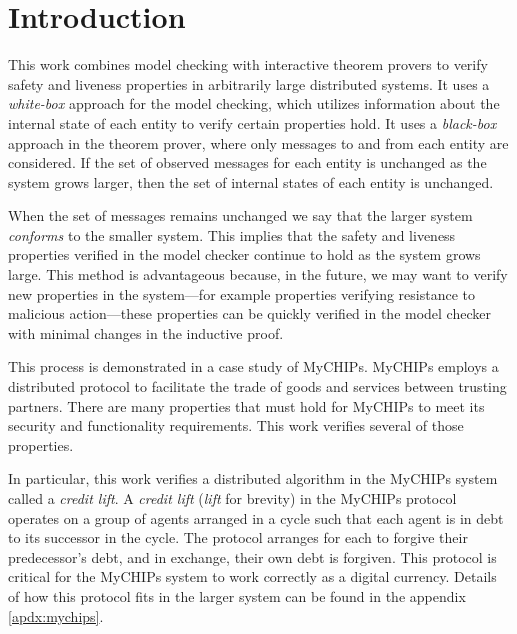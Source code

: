 \documentclass[runningheads]{llncs}
\begin{document}




\section{Introduction}
\label{chap:introduction}
This work combines model checking with interactive theorem provers to verify safety and liveness properties in arbitrarily large distributed systems.
It uses a \emph{white-box} approach for the model checking, which utilizes information about the internal state of each entity to verify certain properties hold.
It uses a \emph{black-box} approach in the theorem prover, where only messages to and from each entity are considered.
If the set of observed messages for each entity is unchanged as the system grows larger, then the set of internal states of each entity is unchanged.

When the set of messages remains unchanged we say that the larger system \emph{conforms} to the smaller system\cite{dill_trace_theory}. This implies that the safety and liveness properties verified in the model checker continue to hold as the system grows large. This method is advantageous because, in the future, we may want to verify new properties in the system---for example properties verifying resistance to malicious action---these properties can be quickly verified in the model checker with minimal changes in the inductive proof.

This process is demonstrated in a case study of MyCHIPs. MyCHIPs employs a distributed protocol to facilitate the trade of goods and services between trusting partners. There are many properties that must hold for MyCHIPs to meet its security and functionality requirements. This work verifies several of those properties.

In particular, this work verifies a distributed algorithm in the MyCHIPs system called a \emph{credit lift}. A \emph{credit lift} (\emph{lift} for brevity) in the MyCHIPs protocol operates on a group of agents arranged in a cycle such that each agent is in debt to its successor in the cycle. The protocol arranges for each to forgive their predecessor's debt, and in exchange, their own debt is forgiven. This protocol is critical for the MyCHIPs system to work correctly as a digital currency. Details of how this protocol fits in the larger system can be found in the appendix \ref{apdx:mychips}.
\end{document}
